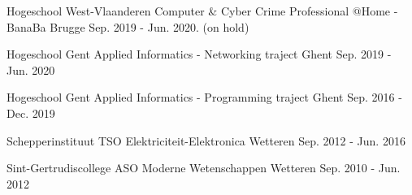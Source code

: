 

\begin{cventries}

\cventry
{Hogeschool West-Vlaanderen} %
{Computer \& Cyber Crime Professional @Home - BanaBa} %
{Brugge} %
{Sep. 2019 - Jun. 2020. (on hold)} %

\cventry
{Hogeschool Gent} %
{Applied Informatics - Networking traject} %
{Ghent} %
{Sep. 2019 - Jun. 2020} %

\cventry
{Hogeschool Gent} %
{Applied Informatics - Programming traject} %
{Ghent} %
{Sep. 2016 - Dec. 2019} %

\cventry
{Schepperinstituut} %
{TSO Elektriciteit-Elektronica} %
{Wetteren} %
{Sep. 2012 - Jun. 2016} %

\cventry
{Sint-Gertrudiscollege} %
{ASO Moderne Wetenschappen} %
{Wetteren} %
{Sep. 2010 - Jun. 2012} %

\end{cventries}

